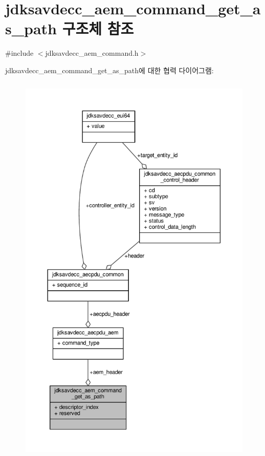 \hypertarget{structjdksavdecc__aem__command__get__as__path}{}\section{jdksavdecc\+\_\+aem\+\_\+command\+\_\+get\+\_\+as\+\_\+path 구조체 참조}
\label{structjdksavdecc__aem__command__get__as__path}


{\ttfamily \#include $<$jdksavdecc\+\_\+aem\+\_\+command.\+h$>$}



jdksavdecc\+\_\+aem\+\_\+command\+\_\+get\+\_\+as\+\_\+path에 대한 협력 다이어그램\+:
\nopagebreak
\begin{figure}[H]
\begin{center}
\leavevmode
\includegraphics[height=550pt]{structjdksavdecc__aem__command__get__as__path__coll__graph}
\end{center}
\end{figure}
